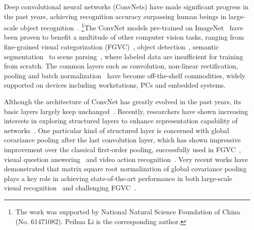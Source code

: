 \documentclass[10pt,twocolumn,letterpaper]{article}
\begin{document}
Deep convolutional neural networks (ConvNets) have made significant progress in the past years, achieving recognition accuracy surpassing human beings in large-scale object recognition~\cite{He_2015_ICCV}.{ \let\thefootnote\relax\footnote{The work was supported by National Natural Science Foundation of China (No. 61471082). Peihua Li is the corresponding author.}}The ConvNet models pre-trained on ImageNet~\cite{imagenet_cvpr09} have been proven to benefit a multitude of other computer vision tasks, ranging from fine-grained visual categorization (FGVC)~\cite{lin2015bilinear}, object detection~\cite{Redmon_2017_CVPR}, semantic segmentation~\cite{Long_2015_CVPR} to scene parsing~\cite{zhou2017scene},   where labeled data are insufficient for training from scratch. The common layers such as convolution, non-linear rectification, pooling and batch normalization~\cite{DBLP:journals/corr/IoffeS15} have  become off-the-shelf commodities, widely supported on devices including workstations, PCs and embedded systems. 


Although the architecture of ConvNet has greatly evolved in the past years, its basic layers  largely keep unchanged~\cite{LeNet1989,Krizhevsky2012ImageNet}.  Recently, researchers have shown increasing interests in exploring structured layers to  enhance representation capability of networks~\cite{Ionescu_2015_ICCV,lin2015bilinear,Arandjelovic_2016_CVPR,LiYunSheng_2017_ICCV}. One particular kind of structured layer is concerned with global covariance pooling after the last convolution layer, which has shown impressive improvement over the classical first-order pooling, successfully used in FGVC~\cite{lin2015bilinear},  visual question answering~\cite{Kafle_2017_ICCV} and  video action recognition~\cite{WangYunbo_2017_CVPR}.   Very recent works  have demonstrated that  matrix square root normalization of global covariance pooling plays a key role in achieving state-of-the-art performance in both large-scale visual recognition~\cite{Li_2017_ICCV} and  challenging FGVC~\cite{lin2017improved,Wang_2017_CVPR}.  
\end{document}

